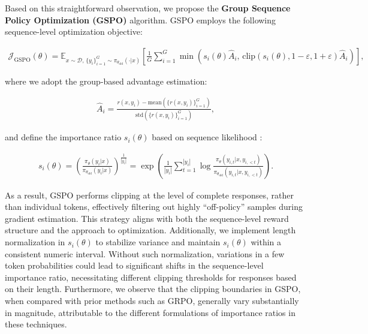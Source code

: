 Based on this straightforward observation, we propose the \textbf{Group Sequence Policy Optimization (GSPO)} algorithm. GSPO employs the following sequence-level optimization objective:

\begin{align}
\mathcal{J}_\text{GSPO} (\theta) =
\mathbb{E}_{ x \sim \mathcal{D},\, \{y_i\}_{i=1}^G \sim \pi_{\theta_\text{old}}( \cdot | x) }
\left[ 
\frac{1}{G} \sum_{i=1}^{G}
\min \left( s_{i}(\theta)  \widehat{A}_{i},  \, \mathrm{clip} \left( s_{i}(\theta), 1 - {\varepsilon}, 1 + {\varepsilon} \right) \widehat{A}_{i} \right) 
\right],
\label{equ:gspo}
\end{align}

where we adopt the group-based advantage estimation:

\begin{align}
\widehat{A}_{i} = \frac{r(x, y_i) - \mathrm{mean} \left( \{ r(x, y_i) \}_{i=1}^G \right) }{ \mathrm{std} \left( \{ r(x, y_i) \}_{i=1}^G \right) },
\end{align}

and define the importance ratio $s_{i}(\theta)$ based on sequence likelihood \citep{click}:

\begin{align}
s_{i}(\theta) = \left( \frac{ \pi_{\theta} (y_i | x) }{ \pi_{\theta_\text{old}} (y_i | x)} \right)^{\frac{1}{|y_i|}}
=
\exp \left( \frac{1}{|y_i|} \sum_{t=1}^{|y_i|} \log \frac{ \pi_{\theta} (y_{i,t} | x, y_{i,<t}) }{ \pi_{\theta_\text{old}} (y_{i,t} | x,y_{i,<t})} \right).
\end{align}

As a result, GSPO performs clipping at the level of complete responses, rather than individual tokens, effectively filtering out highly ``off-policy'' samples during gradient estimation. This strategy aligns with both the sequence-level reward structure and the approach to optimization. Additionally, we implement length normalization in $s_{i}(\theta)$ to stabilize variance and maintain $s_{i}(\theta)$ within a consistent numeric interval. Without such normalization, variations in a few token probabilities could lead to significant shifts in the sequence-level importance ratio, necessitating different clipping thresholds for responses based on their length. Furthermore, we observe that the clipping boundaries in GSPO, when compared with prior methods such as GRPO, generally vary substantially in magnitude, attributable to the different formulations of importance ratios in these techniques.

